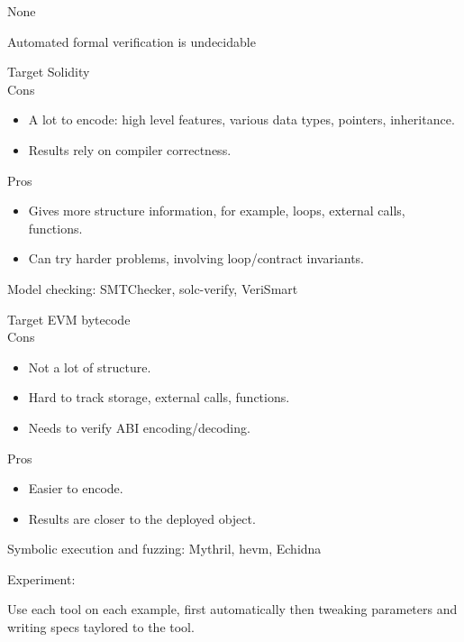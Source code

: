 \documentclass[aspectratio=169,10pt]{beamer}
\begin{document}
\begin{frame}[fragile]
\begin{center}
None
\end{center}
\end{frame}

\begin{frame}[fragile]
\begin{center}
Automated formal verification is undecidable
\end{center}
\end{frame}

\begin{frame}[fragile]
Target Solidity\\
Cons
\begin{itemize}
\item A lot to encode: high level features, various data types, pointers, inheritance.
\item Results rely on compiler correctness.
\end{itemize}
Pros\\
\begin{itemize}
\item Gives more structure information, for example, loops, external calls, functions.
\item Can try harder problems, involving loop/contract invariants.
\end{itemize}
Model checking: SMTChecker, solc-verify, VeriSmart
\end{frame}

\begin{frame}[fragile]
Target EVM bytecode\\
Cons
\begin{itemize}
\item Not a lot of structure.
\item Hard to track storage, external calls, functions.
\item Needs to verify ABI encoding/decoding.
\end{itemize}
Pros\\
\begin{itemize}
\item Easier to encode.
\item Results are closer to the deployed object.
\end{itemize}
Symbolic execution and fuzzing: Mythril, hevm, Echidna
\end{frame}

\begin{frame}[fragile]
Experiment:
\begin{center}
Use each tool on each example, first automatically then tweaking parameters and writing specs taylored to the tool.
\end{center}
\end{frame}
\end{document}
